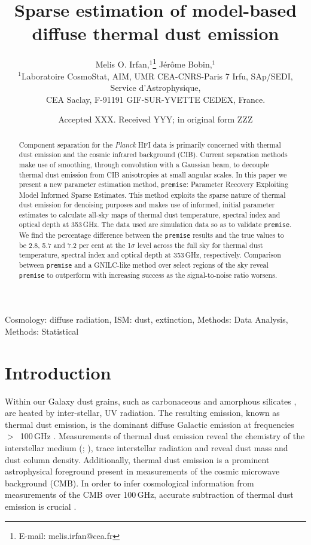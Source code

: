 \documentclass[a4paper,fleqn,usenatbib]{mnras}
\title[Sparse parameter estimation]{Sparse estimation of model-based diffuse thermal dust emission}
\author[M. O. Irfan et al.]{
Melis O. Irfan,$^{1}$\thanks{E-mail: melis.irfan@cea.fr}
J\'er\^ome Bobin,$^{1}$
\\
$^{1}$Laboratoire CosmoStat, AIM, UMR CEA-CNRS-Paris 7 Irfu, SAp/SEDI, Service d'Astrophysique, \\ CEA Saclay, F-91191 GIF-SUR-YVETTE CEDEX, France.\\
}
\date{Accepted XXX. Received YYY; in original form ZZZ}
\begin{document}
\label{firstpage}
\pagerange{\pageref{firstpage}--\pageref{lastpage}}
\maketitle

\begin{abstract}
Component separation for the {\it{Planck}} HFI data is primarily concerned with thermal dust emission and the cosmic infrared background (CIB). Current separation methods make use of smoothing, through convolution with a Gaussian beam, to decouple thermal dust emission from CIB anisotropies at small angular scales. In this paper we present a new parameter estimation method, {\texttt{premise}}: Parameter Recovery Exploiting Model Informed Sparse Estimates. This method exploits the sparse nature of thermal dust emission for denoising purposes and makes use of informed, initial parameter estimates to calculate all-sky maps of thermal dust temperature, spectral index and optical depth at 353\,GHz. The data used are simulation data so as to validate {\texttt{premise}}. We find the percentage difference between the {\texttt{premise}} results and the true values to be 2.8, 5.7 and 7.2 per cent at the 1$\sigma$ level across the full sky for thermal dust temperature, spectral index and optical depth at 353\,GHz, respectively. Comparison between {\texttt{premise}} and a GNILC-like method over select regions of the sky reveal {\texttt{premise}} to outperform with increasing success as the signal-to-noise ratio worsens.  
\end{abstract}

\begin{keywords}
Cosmology: diffuse radiation, ISM: dust, extinction, Methods: Data Analysis, Methods: Statistical
\end{keywords}



\section{Introduction}

Within our Galaxy dust grains, such as carbonaceous and amorphous silicates \citep{draine}, are heated by inter-stellar, UV radiation. The resulting emission, known as thermal dust emission, is the dominant diffuse Galactic emission at frequencies{\mbox{ $>$ 100\,GHz}} \citep{bennett}. Measurements of thermal dust emission reveal the chemistry of the interstellar medium (\citet{comp11}; \cite{jones}), trace interstellar radiation and reveal dust mass and dust column density. Additionally, thermal dust emission is a prominent astrophysical foreground present in measurements of the cosmic microwave background (CMB). In order to infer cosmological information from measurements of the CMB over 100\,GHz, accurate subtraction of thermal dust emission is crucial \citep{planckCompSep}.
\end{document}
